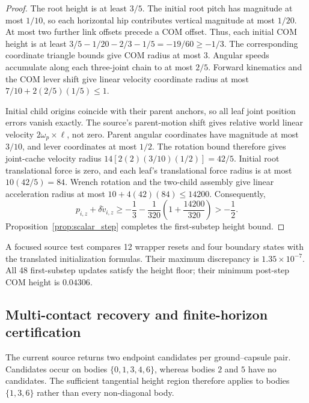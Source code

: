 \begin{proof}
The root height is at least $3/5$.
The initial root pitch has magnitude at most $1/10$, so each horizontal hip contributes vertical magnitude at most $1/20$.
At most two further link offsets precede a COM offset.
Thus, each initial COM height is at least $3/5-1/20-2/3-1/5=-19/60\ge-1/3$.
The corresponding coordinate triangle bounds give COM radius at most $3$.
Angular speeds accumulate along each three-joint chain to at most $2/5$.
Forward kinematics and the COM lever shift give linear velocity coordinate radius at most $7/10+2(2/5)(1/5)\le1$.

Initial child origins coincide with their parent anchors, so all leaf joint position errors vanish exactly.
The source's parent-motion shift gives relative world linear velocity $2\omega_p\mathbin{\times}\ell$, not zero.
Parent angular coordinates have magnitude at most $3/10$, and lever coordinates at most $1/2$.
The rotation bound therefore gives joint-cache velocity radius $14[2(2)(3/10)(1/2)]=42/5$.
Initial root translational force is zero, and each leaf's translational force radius is at most $10(42/5)=84$.
Wrench rotation and the two-child assembly give linear acceleration radius at most $10+4(42)(84)\le14200$.
Consequently,
\begin{equation}
 p_{i,z}+\delta\widetilde v_{i,z}
 \ge-\frac13-\frac1{320}\left(1+\frac{14200}{320}\right)>-\frac12.
\end{equation}
Proposition~\ref{prop:scalar_step} completes the first-substep height bound.
\end{proof}

A focused source test compares 12 wrapper resets and four boundary states with the translated initialization formulas.
Their maximum discrepancy is $1.35\times10^{-7}$.
All 48 first-substep updates satisfy the height floor; their minimum post-step COM height is $0.04306$.

\subsection{Multi-contact recovery and finite-horizon certification}
\label{app:contact_barrier}

The current source returns two endpoint candidates per ground--capsule pair.
Candidates occur on bodies $\{0,1,3,4,6\}$, whereas bodies $2$ and $5$ have no candidates.
The sufficient tangential height region therefore applies to bodies $\{1,3,6\}$ rather than every non-diagonal body.

